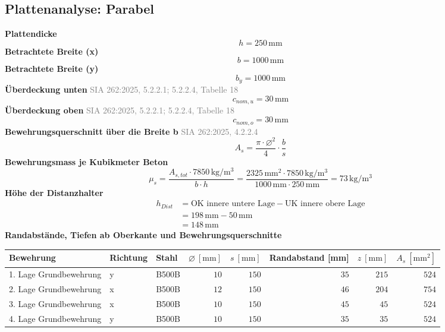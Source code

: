 \documentclass[11pt,a4paper]{article}
\newcommand{\normref}[1]{{\small\textcolor{gray}{#1}}}
\begin{document}
\subsection{Plattenanalyse: Parabel}
\noindent\textbf{Plattendicke}
\begin{equation*}
h = 250\,\mathrm{mm}
\end{equation*}
\noindent\textbf{Betrachtete Breite (x)}
\begin{equation*}
b = 1000\,\mathrm{mm}
\end{equation*}
\noindent\textbf{Betrachtete Breite (y)}
\begin{equation*}
b_y = 1000\,\mathrm{mm}
\end{equation*}
\noindent\textbf{Überdeckung unten} \hfill \normref{SIA 262:2025, 5.2.2.1; 5.2.2.4, Tabelle 18}
\begin{equation*}
c_{nom,u} = 30\,\mathrm{mm}
\end{equation*}
\noindent\textbf{Überdeckung oben} \hfill \normref{SIA 262:2025, 5.2.2.1; 5.2.2.4, Tabelle 18}
\begin{equation*}
c_{nom,o} = 30\,\mathrm{mm}
\end{equation*}
\noindent\textbf{Bewehrungsquerschnitt über die Breite b} \hfill \normref{SIA 262:2025, 4.2.2.4}
\begin{equation*}
A_s = \frac{\pi \cdot \varnothing^{2}}{4} \cdot \frac{b}{s}
\end{equation*}
\noindent\textbf{Bewehrungsmass je Kubikmeter Beton}
\begin{equation*}
\mu_s = \frac{A_{s,tot} \cdot 7850\,\mathrm{kg}/\mathrm{m}^{3}}{b \cdot h} = \frac{2325\,\mathrm{mm}^{2} \cdot 7850\,\mathrm{kg}/\mathrm{m}^{3}}{1000\,\mathrm{mm} \cdot 250\,\mathrm{mm}} = 73\,\mathrm{kg}/\mathrm{m}^{3}
\end{equation*}
\noindent\textbf{Höhe der Distanzhalter}
\begin{equation*}
\begin{aligned}
  h_{Dist} &= \text{OK innere untere Lage} - \text{UK innere obere Lage} \\
  &= 198\,\mathrm{mm} - 50\,\mathrm{mm} \\
  &= 148\,\mathrm{mm}
\end{aligned}
\end{equation*}
\noindent\textbf{Randabstände, Tiefen ab Oberkante und Bewehrungsquerschnitte}
\begin{longtable}{lllrrrrr}
\hline
Bewehrung & Richtung & Stahl & $\varnothing\ [\mathrm{mm}]$ & $s\ [\mathrm{mm}]$ & Randabstand [mm] & $z\ [\mathrm{mm}]$ & $A_s\ [\mathrm{mm}^2]$ \\
\hline
\endhead
1. Lage Grundbewehrung & y & B500B & $10$ & $150$ & $35$ & $215$ & $524$ \\
2. Lage Grundbewehrung & x & B500B & $12$ & $150$ & $46$ & $204$ & $754$ \\
3. Lage Grundbewehrung & x & B500B & $10$ & $150$ & $45$ & $45$ & $524$ \\
4. Lage Grundbewehrung & y & B500B & $10$ & $150$ & $35$ & $35$ & $524$ \\
\hline
\end{longtable}
\end{document}
